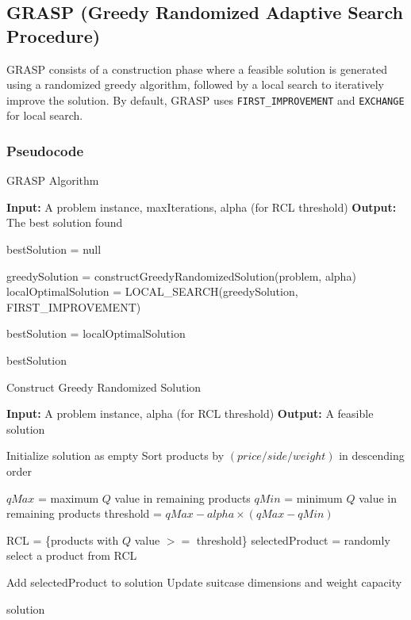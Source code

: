 \documentclass{article}
\begin{document}
\subsection{GRASP (Greedy Randomized Adaptive Search Procedure)}
GRASP consists of a construction phase where a feasible solution is generated using a randomized greedy algorithm, followed by a local search to iteratively improve the solution. By default, GRASP uses \texttt{FIRST\_IMPROVEMENT} and \texttt{EXCHANGE} for local search.

\subsubsection{Pseudocode}
\begin{algorithm}
\caption{GRASP Algorithm}
\begin{algorithmic}
    \State \textbf{Input:} A problem instance, maxIterations, alpha (for RCL threshold)
    \State \textbf{Output:} The best solution found

    \State bestSolution = null

        \State greedySolution = constructGreedyRandomizedSolution(problem, alpha)
        \State localOptimalSolution = LOCAL\_SEARCH(greedySolution, FIRST\_IMPROVEMENT)

            \State bestSolution = localOptimalSolution
        \EndIf
    \EndFor

    \State \Return bestSolution
\end{algorithmic}
\end{algorithm}

\begin{algorithm}
\caption{Construct Greedy Randomized Solution}
\begin{algorithmic}
    \State \textbf{Input:} A problem instance, alpha (for RCL threshold)
    \State \textbf{Output:} A feasible solution

    \State Initialize solution as empty
    \State Sort products by $(price / side / weight)$ in descending order

        \State $qMax$ = maximum $Q$ value in remaining products
        \State $qMin$ = minimum $Q$ value in remaining products
        \State threshold = $qMax - alpha \times (qMax - qMin)$

        \State RCL = \{products with $Q$ value $>=$ threshold\}
        \State selectedProduct = randomly select a product from RCL

            \State Add selectedProduct to solution
            \State Update suitcase dimensions and weight capacity
        \EndIf
    \EndWhile

    \State \Return solution
\end{algorithmic}
\end{algorithm}
\end{document}
